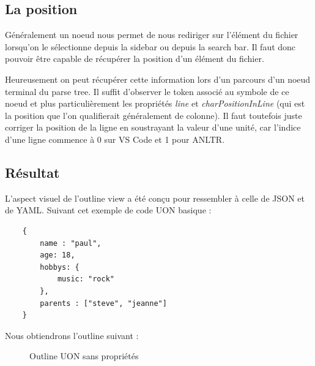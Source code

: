 \documentclass[
    iict, %
    il, %
]{heig-tb}
\begin{document}
\subsection{La position}

Généralement un noeud nous permet de nous rediriger sur l'élément du fichier lorsqu'on le sélectionne depuis la sidebar ou depuis la search bar.
Il faut donc pouvoir être capable de récupérer la position d'un élément du fichier.

Heureusement on peut récupérer cette information lors d'un parcours d'un noeud terminal du parse tree.
Il suffit d'observer le token associé au symbole de ce noeud et plus particulièrement les
propriétés \emph{line} et \emph{charPositionInLine} (qui est la position que l'on qualifierait généralement de colonne).
Il faut toutefois juste corriger la position de la ligne en soustrayant la valeur d'une unité, car l'indice d'une ligne commence à 0 sur VS Code et 1 pour ANLTR.

\subsection{Résultat}
L'aspect visuel de l'outline view a été conçu pour ressembler à celle de JSON et de YAML.
Suivant cet exemple de code UON basique :

\begin{lstlisting}
    {
        name : "paul",
        age: 18,
        hobbys: {
            music: "rock"
        },
        parents : ["steve", "jeanne"]
    }
\end{lstlisting}

Nous obtiendrons l'outline suivant :

\begin{figure}[!h]
    \begin{center}
    \end{center}
    \caption[Outline UON sans propriétés]{\label{uon-payload-outline-without-properties} Outline UON sans propriétés}
\end{figure}
\end{document}
